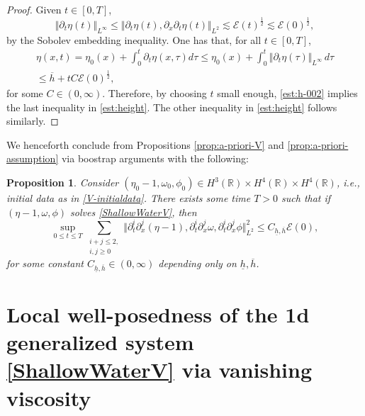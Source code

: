 \documentclass[reqno,11pt]{amsart}
\newcommand{\norm}[2]{\Vert #1 \Vert_{#2}}
\theoremstyle{plain}
\newtheorem{proposition}[theorem]{Proposition}
\theoremstyle{definition}
\numberwithin{equation}{section}
\begin{document}
\begin{proof}
    Given $ t \in [0,T] $,
    \begin{equation}
    \label{est:h-001}
        \norm{\partial_t \eta(t)}{L^\infty} \leq \norm{\partial_t \eta(t),\partial_{x}\partial_t \eta(t)}{L^2} \lesssim \mathcal E(t)^{\frac{1}{2}} \lesssim \mathcal E(0)^{\frac{1}{2}},
    \end{equation}
    by the Sobolev embedding inequality. One has that, for all $ t \in [0,T] $,
    \begin{equation}
    \label{est:h-002}
    \begin{gathered}
    \eta(x,t)  = \eta_0(x) + \int_0^t \partial_t \eta(x,\tau) d\tau \leq \eta_0(x) + \int_0^t \norm{\partial_t \eta(\tau)}{L^\infty} \,d\tau\\
    \leq \overline h + t C \mathcal E(0)^{\frac{1}{2}},
    \end{gathered}
    \end{equation}
    for some $ C \in (0,\infty) $. 
    Therefore, by choosing $ t $ small enough, \eqref{est:h-002} implies the last inequality in \eqref{est:height}. The other inequality in \eqref{est:height} follows similarly. 
\end{proof}

We henceforth conclude from Propositions \ref{prop:a-priori-V} and \ref{prop:a-priori-assumption} via boostrap arguments with the following:
\begin{proposition}
    \label{EnergyProposition}
    Consider $ (\eta_0 -1, \omega_0, \phi_0 ) \in H^3(\mathbb{R}) \times H^4(\mathbb{R}) \times H^4(\mathbb{R}) $, i.e., initial data as in \eqref{V-initialdata}. 
    There exists some time $T>0$ such that if $(\eta-1,\omega,\phi)$ solves \eqref{ShallowWaterV}, then
    \begin{equation}
    \label{est:energy-total}
        \sup_{0\leq t\leq T} \sum_{\substack{i+j\leq 2,\\ i,j \geq 0}} \Vert\partial_t^i\partial_x ^j (\eta-1),\partial_t^i\partial_x^j \omega,\partial_t^i\partial_x^{j}\phi\Vert_{L^2}^2 \leq C_{\underline h, \overline h} \mathcal E(0),
    \end{equation}
    for some constant $ C_{\underline h, \overline h} \in (0,\infty) $ depending only on $ \underline h, \overline h $. 
\end{proposition}


\section{Local well-posedness of the 1d generalized system \eqref{ShallowWaterV} via vanishing viscosity}
\label{vv}
\end{document}

